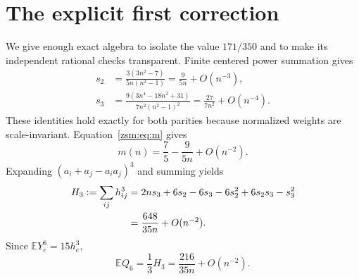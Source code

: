 \documentclass[11pt]{article}
\theoremstyle{definition}\newtheorem{definition}[theorem]{Definition}
\theoremstyle{remark}\newtheorem{remark}[theorem]{Remark}
\newcommand{\E}{\mathbb E}
\begin{document}
\section{The explicit first correction}\label{zsm:sec:first}
We give enough exact algebra to isolate the value $171/350$ and to make its
independent rational checks transparent. Finite centered power summation gives
\begin{align}
 s_2&=\frac{3(3n^2-7)}{5n(n^2-1)}=\frac9{5n}+O(n^{-3}),\label{zsm:eq:s2}\\
 s_3&=\frac{9(3n^4-18n^2+31)}{7n^2(n^2-1)^2}
       =\frac{27}{7n^2}+O(n^{-4}).\label{zsm:eq:s3}
\end{align}
These identities hold exactly for both parities because normalized weights are
scale-invariant. Equation~\eqref{zsm:eq:m} gives
\begin{equation}\label{zsm:eq:mexp}
 m(n)=\frac75-\frac9{5n}+O(n^{-2}).
\end{equation}
Expanding $(a_i+a_j-a_ia_j)^3$ and summing yields
\begin{align}
 H_3:=\sum_{ij}h_{ij}^3
 &=2ns_3+6s_2-6s_3-6s_2^2+6s_2s_3-s_3^2\notag\\
 &=\frac{648}{35n}+O(n^{-2}).\label{zsm:eq:H3}
\end{align}
Since $\E Y_e^6=15h_e^3$,
\begin{equation}\label{zsm:eq:EQ6}
 \E Q_6=\frac13H_3=\frac{216}{35n}+O(n^{-2}).
\end{equation}
\end{document}
